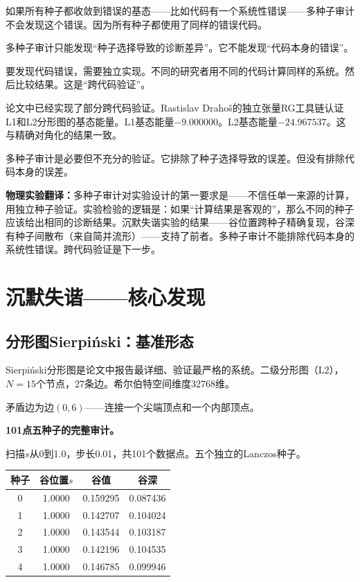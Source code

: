 \documentclass[11pt,a4paper]{book}
\theoremstyle{definition}
\begin{document}
如果所有种子都收敛到错误的基态——比如代码有一个系统性错误——多种子审计不会发现这个错误。因为所有种子都使用了同样的错误代码。

多种子审计只能发现“种子选择导致的诊断差异”。它不能发现“代码本身的错误”。

要发现代码错误，需要独立实现。不同的研究者用不同的代码计算同样的系统。然后比较结果。这是“跨代码验证”。

论文中已经实现了部分跨代码验证。Rastislav Drahoš的独立张量RG工具链认证L1和L2分形图的基态能量。L1基态能量$-9.000000$。L2基态能量$-24.967537$。这与精确对角化的结果一致。

多种子审计是必要但不充分的验证。它排除了种子选择导致的误差。但没有排除代码本身的误差。

\textbf{物理实验翻译：}多种子审计对实验设计的第一要求是——不信任单一来源的计算，用独立种子验证。实验检验的逻辑是：如果“计算结果是客观的”，那么不同的种子应该给出相同的诊断结果。沉默失谐实验的结果——谷位置跨种子精确复现，谷深有种子间散布（来自简并流形）——支持了前者。多种子审计不能排除代码本身的系统性错误。跨代码验证是下一步。

\chapter{沉默失谐——核心发现}

\section{分形图Sierpiński：基准形态}

Sierpiński分形图是论文中报告最详细、验证最严格的系统。二级分形图（L2），$N=15$个节点，27条边。希尔伯特空间维度32768维。

矛盾边为边$(0,6)$——连接一个尖端顶点和一个内部顶点。

\textbf{101点五种子的完整审计。}

扫描$s$从0到1.0，步长0.01，共101个数据点。五个独立的Lanczos种子。

\begin{table}[h]
\centering
\begin{tabular}{cccc}
\toprule
种子 & 谷位置$s$ & 谷值 & 谷深 \\
\midrule
0 & 1.0000 & 0.159295 & 0.087436 \\
1 & 1.0000 & 0.142707 & 0.104024 \\
2 & 1.0000 & 0.143544 & 0.103187 \\
3 & 1.0000 & 0.142196 & 0.104535 \\
4 & 1.0000 & 0.146785 & 0.099946 \\
\bottomrule
\end{tabular}
\end{table}
\end{document}
